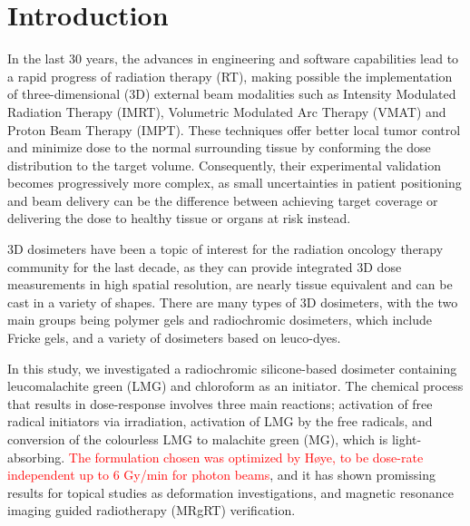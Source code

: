 \documentclass[12pt,twoside]{article}   %
\begin{document}
\section{Introduction}
In the last 30 years, the advances in engineering and software capabilities lead to a rapid progress of radiation therapy (RT), making possible the implementation of three-dimensional (3D) external beam modalities such as Intensity Modulated Radiation Therapy (IMRT), Volumetric Modulated Arc Therapy (VMAT) and Proton Beam Therapy (IMPT)\cite{ed1979}. These techniques offer better local tumor control and minimize dose to the normal surrounding tissue by conforming the dose distribution to the target volume. Consequently, their experimental validation becomes progressively more complex, as small uncertainties in patient positioning and beam delivery can be the difference between achieving target coverage or delivering the dose to healthy tissue or organs at risk instead\cite{Low2011, Liao2020}. \par
3D dosimeters have been a topic of interest for the radiation oncology therapy community for the last decade, as they can provide integrated 3D dose measurements in high spatial resolution, are nearly tissue equivalent and can be cast in a variety of shapes\cite{DeDeene2013, Oldham2015, Skyt2013}. There are many types of 3D dosimeters, with the two main groups being polymer gels and radiochromic dosimeters, which include Fricke gels, and a variety of dosimeters based on leuco-dyes\cite{Baldock2010, Schreiner2015}. \par 

In this study, we investigated a radiochromic silicone-based dosimeter containing leucomalachite green (LMG) and chloroform as an initiator. The chemical process that results in dose-response involves three main reactions; activation of free radical initiators via irradiation, activation of LMG by the free radicals, and conversion of the colourless LMG to malachite green (MG), which is light-absorbing. \textcolor{red}{The formulation chosen was optimized by H\o ye\cite{Hoye2015}, to be dose-rate independent up to 6 Gy/min for photon beams}, and it has shown promissing results for topical studies as deformation investigations\cite{Jensen2020a, Kaplan2017}, and magnetic resonance imaging guided radiotherapy (MRgRT) verification\cite{Jensen2020}. \par 
\end{document}
